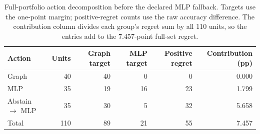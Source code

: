 \begin{table}[ht]
\centering
\caption{Full-portfolio action decomposition before the declared MLP fallback. Targets use the one-point margin; positive-regret counts use the raw accuracy difference. The contribution column divides each group's regret sum by all 110 units, so the entries add to the 7.457-point full-set regret.}
\label{tab:action_confusion}
\small
\begin{tabular}{@{}lrrrrr@{}}
\toprule
Action & Units & Graph target & MLP target & Positive regret & Contribution (pp) \\
\midrule
Graph & 40 & 40 & 0 & 0 & 0.000 \\
MLP & 35 & 19 & 16 & 23 & 1.799 \\
Abstain $\to$ MLP & 35 & 30 & 5 & 32 & 5.658 \\
\midrule
Total & 110 & 89 & 21 & 55 & 7.457 \\
\bottomrule
\end{tabular}
\end{table}
